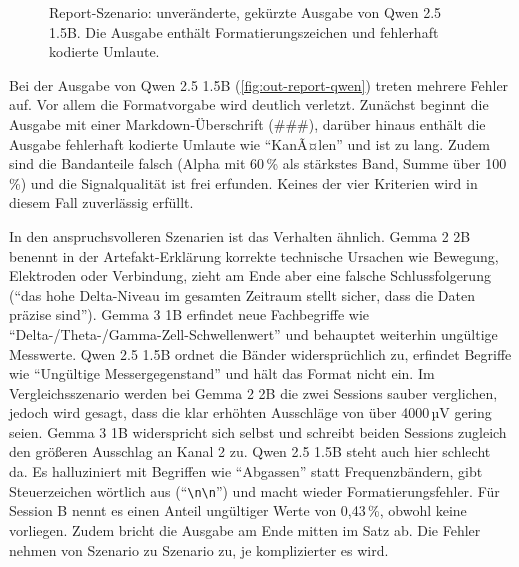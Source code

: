 \begin{figure}[H]
\centering
{\setlength{\fboxsep}{8pt}%
}
\caption[Ausgabe von Qwen 2.5 1.5B]{Report-Szenario: unveränderte, gekürzte Ausgabe von Qwen 2.5 1.5B. Die Ausgabe enthält Formatierungszeichen und fehlerhaft kodierte Umlaute.}
\label{fig:out-report-qwen}
\end{figure}

\noindent Bei der Ausgabe von Qwen 2.5 1.5B (\autoref{fig:out-report-qwen}) treten mehrere Fehler auf. Vor allem die Formatvorgabe wird deutlich verletzt. Zunächst beginnt die Ausgabe mit einer Markdown-Überschrift (\#\#\#), darüber hinaus enthält die Ausgabe fehlerhaft kodierte Umlaute wie \enquote{KanÃ¤len} und ist zu lang. Zudem sind die Bandanteile falsch (Alpha mit 60\,\% als stärkstes Band, Summe über 100\,\%) und die Signalqualität ist frei erfunden. Keines der vier Kriterien wird in diesem Fall zuverlässig erfüllt.
\vspace{\baselineskip}

\noindent In den anspruchsvolleren Szenarien ist das Verhalten ähnlich. Gemma 2 2B benennt in der Artefakt-Erklärung korrekte technische Ursachen wie Bewegung, Elektroden oder Verbindung, zieht am Ende aber eine falsche Schlussfolgerung (\enquote{das hohe Delta-Niveau im gesamten Zeitraum stellt sicher, dass die Daten präzise sind}). Gemma 3 1B erfindet neue Fachbegriffe wie \enquote{Delta-/Theta-/Gamma-Zell-Schwellenwert} und behauptet weiterhin ungültige Messwerte. Qwen 2.5 1.5B ordnet die Bänder widersprüchlich zu, erfindet Begriffe wie \enquote{Ungültige Messergegenstand} und hält das Format nicht ein.
Im Vergleichsszenario werden bei Gemma 2 2B die zwei Sessions sauber verglichen, jedoch wird gesagt, dass die klar erhöhten Ausschläge von über 4000\,µV gering seien. Gemma 3 1B widerspricht sich selbst und schreibt beiden Sessions zugleich den größeren Ausschlag an Kanal 2 zu. Qwen 2.5 1.5B steht auch hier schlecht da. Es halluziniert mit Begriffen wie \enquote{Abgassen} statt Frequenzbändern, gibt Steuerzeichen wörtlich aus (\enquote{\texttt{\textbackslash n\textbackslash n}}) und macht wieder Formatierungsfehler. Für Session B nennt es einen Anteil ungültiger Werte von 0,43\,\%, obwohl keine vorliegen. Zudem bricht die Ausgabe am Ende mitten im Satz ab.
Die Fehler nehmen von Szenario zu Szenario zu, je komplizierter es wird.

